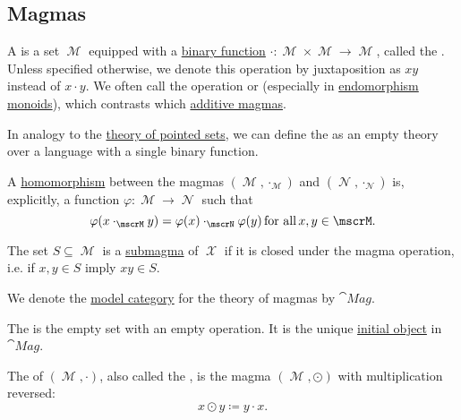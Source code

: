 \subsection{Magmas}\label{subsec:magmas}

\begin{definition}\label{def:magma}
  A  is a set \( \mscrM \) equipped with a \hyperref[def:function/arity]{binary function} \( \cdot: \mscrM \times \mscrM \to \mscrM \), called the . Unless specified otherwise, we denote this operation by juxtaposition as \( xy \) instead of \( x \cdot y \). We often call the operation  or  (especially in \hyperref[def:endomorphism_monoid]{endomorphism monoids}), which contrasts which \hyperref[rem:additive_magma]{additive magmas}.

  \begin{thmenum}
     In analogy to the \hyperref[def:pointed_set/theory]{theory of pointed sets}, we can define the  as an empty theory over a language with a single binary function.

     A \hyperref[def:first_order_homomorphism]{homomorphism} between the magmas \( (\mscrM, \cdot_{\mscrM}) \) and \( (\mscrN, \cdot_{\mscrN}) \) is, explicitly, a function \( \varphi: \mscrM \to \mscrN \) such that
    \begin{equation}\label{eq:def:magma/homomorphism}
      \varphi(x \cdot_{\mscrM} y) = \varphi(x) \cdot_{\mscrN} \varphi(y) \T{for all} x, y \in \mscrM.
    \end{equation}

     The set \( S \subseteq \mscrM \) is a \hyperref[def:first_order_substructure]{submagma} of \( \mscrX \) if it is closed under the magma operation, i.e. if \( x, y \in S \) imply \( xy \in S \).

     We denote the \hyperref[def:first_order_model_category]{model category} for the theory of magmas by \( \cat{Mag} \).

     The  is the empty set with an empty operation. It is the unique \hyperref[def:zero_objects/initial]{initial object} in \( \cat{Mag} \).

     The  of \( (\mscrM, \cdot) \), also called the , is the magma \( (\mscrM, \odot) \) with multiplication reversed:
    \begin{equation*}
      x \odot y \coloneqq y \cdot x.
    \end{equation*}


\end{thmenum}
\end{definition}

